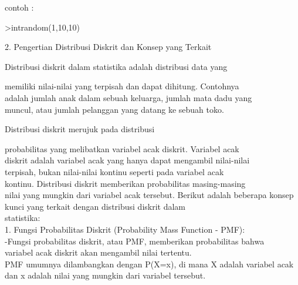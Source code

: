 \documentclass[a4paper,10pt]{article}
\begin{document}
\begin{eulernotebook}
\begin{eulercomment}
\begin{eulercomment}
\begin{eulercomment}
\begin{eulercomment}
\begin{eulercomment}
\begin{eulercomment}
\begin{eulercomment}
contoh :
\end{eulercomment}
\begin{eulerprompt}
>intrandom(1,10,10)
\end{eulerprompt}
\begin{euleroutput}
  [2,  4,  6,  7,  3,  3,  2,  9,  10,  2]
\end{euleroutput}
\begin{eulercomment}
\end{eulercomment}
\eulersubheading{}
\begin{eulercomment}
2. Pengertian Distribusi Diskrit dan Konsep yang Terkait

\end{eulercomment}
\begin{eulerttcomment}
       Distribusi diskrit dalam statistika adalah distribusi data yang
\end{eulerttcomment}
\begin{eulercomment}
memiliki nilai-nilai yang terpisah dan dapat dihitung. Contohnya\\
adalah jumlah anak dalam sebuah keluarga, jumlah mata dadu yang\\
muncul, atau jumlah pelanggan yang datang ke sebuah toko.\\
\end{eulercomment}
\begin{eulerttcomment}
       Distribusi diskrit merujuk pada distribusi
\end{eulerttcomment}
\begin{eulercomment}
probabilitas yang melibatkan variabel acak diskrit. Variabel acak\\
diskrit adalah variabel acak yang hanya dapat mengambil nilai-nilai\\
terpisah, bukan nilai-nilai kontinu seperti pada variabel acak\\
kontinu. Distribusi diskrit memberikan probabilitas masing-masing\\
nilai yang mungkin dari variabel acak tersebut. Berikut adalah
beberapa konsep kunci yang terkait dengan distribusi diskrit dalam\\
statistika: \\
1. Fungsi Probabilitas Diskrit (Probability Mass Function - PMF):\\
-Fungsi probabilitas diskrit, atau PMF, memberikan probabilitas bahwa\\
variabel acak diskrit akan mengambil nilai tertentu.\\
PMF umumnya dilambangkan dengan P(X=x), di mana X adalah variabel acak\\
dan x adalah nilai yang mungkin dari variabel tersebut.\\
\end{eulercomment}
\begin{eulerttcomment}
 

\end{eulerttcomment}
\end{eulercomment}
\end{eulercomment}
\end{eulercomment}
\end{eulercomment}
\end{eulercomment}
\end{eulercomment}
\end{eulernotebook}
\end{document}
